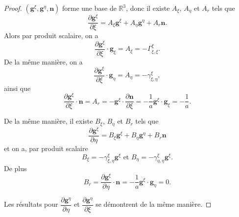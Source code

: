 \begin{proof}
$(\mathbf{g}^{\xi}, \mathbf{g}^{\eta}, \mathbf{n})$ forme une base de $\mathbb{R}^3$, donc il existe $A_{\xi}$, $A_{\eta}$ et $A_r$ tels que 
\begin{equation}
\dfrac{\partial \mathbf{g}^{\xi}}{\partial \xi} = A_{\xi} \mathbf{g}^{\xi} + A_{\eta} \mathbf{g}^{\eta} + A_r \mathbf{n}.
\end{equation}
Alors par produit scalaire, on a 
\begin{equation}
\dfrac{\partial \mathbf{g}^{\xi}}{\partial \xi} \cdot \mathbf{g}_{\xi} = A_{\xi} = - \Gamma_{\xi, \xi}^{\xi}.
\end{equation}
De la même manière, on a 
\begin{equation}
\dfrac{\partial \mathbf{g}^{\xi}}{\partial \xi} \cdot \mathbf{g}_{\eta} = A_{\eta} = - \gamma_{\xi, \eta}^{\xi},
\end{equation}
ainsi que
\begin{equation}
\dfrac{\partial \mathbf{g}^{\xi}}{\partial \xi} \cdot \mathbf{n} = A_r = - \mathbf{g}^{\xi} \cdot \dfrac{\partial \mathbf{n}}{\partial \xi} = - \dfrac{1}{a} \mathbf{g}^{\xi} \cdot \mathbf{g}_{\xi} = -\dfrac{1}{a}.
\end{equation}

De la même manière, il existe $B_{\xi}$, $B_{\eta}$ et $B_r$ tels que
\begin{equation}
\dfrac{\partial \mathbf{g}^{\xi}}{\partial \eta} = B_{\xi} \mathbf{g}^{\xi} + B_{\eta} \mathbf{g}^{\eta} + B_r \mathbf{n}
\end{equation}
et on a, par produit scalaire
\begin{equation}
B_{\xi} = - \gamma_{\xi, \eta}^{\xi} \mathbf{g}^{\xi} \text{ et } B_{\eta} = - \gamma_{\eta, \eta}^{\xi} \mathbf{g}^{\xi}.
\end{equation}
De plus
\begin{equation}
B_r = \dfrac{\partial \mathbf{g}^{\xi}}{\partial \eta} \cdot \mathbf{n} = - \dfrac{1}{a} \mathbf{g}^{\xi} \cdot \mathbf{g}_{\eta} = 0.
\end{equation}

Les résultats pour $\dfrac{\partial \mathbf{g}^{\eta}}{\partial \eta}$ et $\dfrac{\partial \mathbf{g}^{\eta}}{\partial \xi}$ se démontrent de la même manière.
\end{proof}


